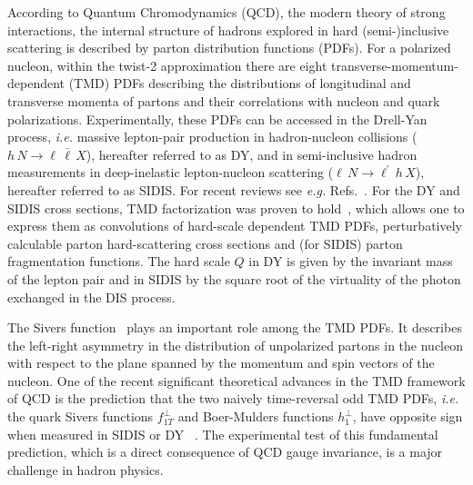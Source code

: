 \documentclass[a4paper,manyauthors,nocleardouble,COMPASS]{cernphprep}
\begin{document}
%
%
%
According to Quantum Chromodynamics (QCD), the modern theory of strong interactions, the internal structure of hadrons explored in hard (semi-)inclusive scattering is described by parton distribution functions (PDFs). For a polarized nucleon, within the twist-2 approximation there are eight transverse-momentum-dependent (TMD) PDFs describing the distributions of longitudinal and transverse momenta of partons and their correlations with nucleon and quark polarizations. Experimentally, these PDFs can be accessed in the Drell-Yan process, \textit{i.e.} massive lepton-pair production in hadron-nucleon collisions ($h \, N \rightarrow \ell\,\bar{\ell}\, X$), hereafter referred to as DY, and in semi-inclusive hadron measurements in deep-inelastic lepton-nucleon scattering ($\ell \,N \rightarrow \ell^\prime \,h \, X$), hereafter referred to as SIDIS. For recent reviews see \textit{e.g.} Refs.~\cite{Perdekamp:2015vwa,Peng:2014hta,Aidala:2012mv}.
%
For the DY and SIDIS cross sections, TMD factorization was proven to hold~\cite{Collins:2011zzd}, which allows one to express them as convolutions of hard-scale dependent TMD PDFs, perturbatively calculable parton hard-scattering cross sections and  (for SIDIS) parton fragmentation functions. The hard scale $Q$ in DY is given by the invariant mass of the lepton pair and in SIDIS by the square root of the virtuality of the photon exchanged in the DIS process.

The Sivers function~\cite{Sivers:1989cc} plays an important role among the TMD PDFs. It describes the left-right asymmetry in the distribution of unpolarized partons in the nucleon with respect to the plane spanned by the momentum and spin vectors of the nucleon.
One of the recent significant theoretical advances in the TMD framework of QCD is the prediction that the two naively time-reversal odd TMD PDFs, \textit{i.e.} the quark Sivers functions $f_{1T}^\perp$ and Boer-Mulders functions $h_{1}^\perp$, have opposite sign when measured in SIDIS or DY
~\cite{Collins:2002kn, Brodsky:2002cx, Brodsky:2002rv}.
The experimental test of this fundamental prediction, which is a direct consequence of QCD gauge invariance, is a major challenge in hadron physics.
\end{document}
